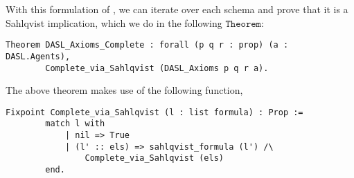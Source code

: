 With this formulation of \DASL, we can iterate over each schema and prove that it is a Sahlqvist implication, which we do in the following $\mathtt{Theorem}$:

\begin{tcolorbox}
	\begin{lstlisting}[language=Coq]
Theorem DASL_Axioms_Complete : forall (p q r : prop) (a : DASL.Agents),
		Complete_via_Sahlqvist (DASL_Axioms p q r a).
	\end{lstlisting}
\end{tcolorbox}

The above theorem makes use of the following function,

\begin{tcolorbox}
	\begin{lstlisting}[language=Coq]
	Fixpoint Complete_via_Sahlqvist (l : list formula) : Prop :=  
		match l with
			| nil => True
			| (l' :: els) => sahlqvist_formula (l') /\ 
				Complete_via_Sahlqvist (els)
		end.
	\end{lstlisting}
\end{tcolorbox}
%
%
